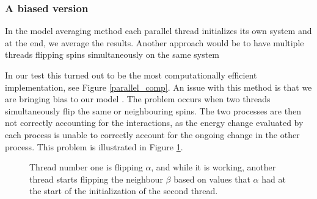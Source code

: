 \documentclass[a4paper]{article}
\begin{document}
\subsubsection*{A biased version}

In the model averaging method each parallel thread initializes its own system and at the end, we average the results. Another approach would be to have multiple threads flipping spins simultaneously on the same system


In our test this turned out to be the most computationally efficient implementation, see Figure \ref{parallel_comp}. An issue with this method is that we are bringing bias to our model \cite{par_ice}. The problem occurs when two threads simultaneously flip the same or neighbouring spins. The two processes are then not correctly accounting for the interactions, as the energy change evaluated by each process is unable to correctly account for the ongoing change in the other process. This problem is illustrated in Figure \ref{neighbour}.



\begin{figure}[H]

\hfill
{}
\hfill
{}
\hfill
\caption{Thread number one is flipping $\alpha$, and while it is working, another thread starts flipping the neighbour $\beta$ based on values that $\alpha$ had at the start of the initialization of the second thread.}
\label{neighbour}
\end{figure}
\end{document}
